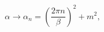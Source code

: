 \begin{equation}
\alpha \rightarrow \alpha _{n}=\left(\frac{2\pi n}{\beta }\right)^{2}+m^{2},\end{equation}

